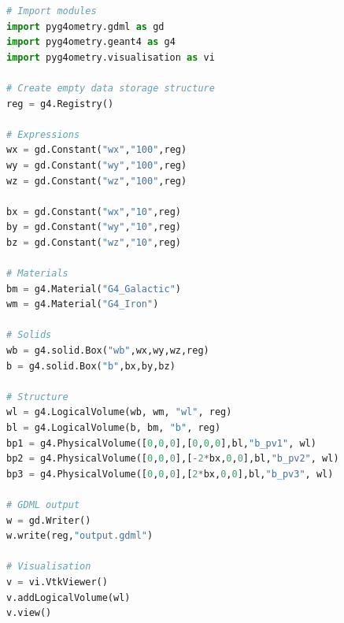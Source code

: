 \documentclass[final,5p,times,twocolumn]{elsarticle}
\newcommand{\PYGEOMETRY}{\textsc{Pyg4ometry}}
\begin{document}
\begin{lstlisting}[caption={A simple Python script using \PYGEOMETRY{} to create a simple Geant4 geometry.},label={lst:pythonRapidModelling}, language=Python]
# Import modules 
import pyg4ometry.gdml as gd
import pyg4ometry.geant4 as g4
import pyg4ometry.visualisation as vi

# Create empty data storage structure
reg = g4.Registry()

# Expressions 
wx = gd.Constant("wx","100",reg)
wy = gd.Constant("wy","100",reg)
wz = gd.Constant("wz","100",reg)

bx = gd.Constant("wx","10",reg)
by = gd.Constant("wy","10",reg)
bz = gd.Constant("wz","10",reg)

# Materials
bm = g4.Material("G4_Galactic") 
wm = g4.Material("G4_Iron") 

# Solids
wb = g4.solid.Box("wb",wx,wy,wz,reg)
b = g4.solid.Box("b",bx,by,bz)

# Structure 
wl = g4.LogicalVolume(wb, wm, "wl", reg)
bl = g4.LogicalVolume(b, bm, "b", reg)
bp1 = g4.PhysicalVolume([0,0,0],[0,0,0],bl,"b_pv1", wl) 
bp2 = g4.PhysicalVolume([0,0,0],[-2*bx,0,0],bl,"b_pv2", wl)  
bp3 = g4.PhysicalVolume([0,0,0],[2*bx,0,0],bl,"b_pv3", wl) 
                        
# GDML output
w = gd.Writer()
w.write(reg,"output.gdml")

# Visualisation 
v = vi.VtkViewer()
v.addLogicalVolume(wl)
v.view()
\end{lstlisting}
\end{document}
